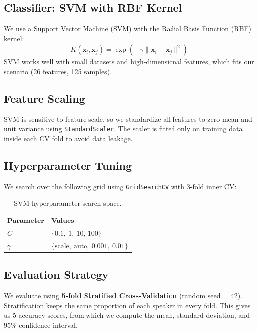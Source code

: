 \subsection{Classifier: SVM with RBF Kernel}
We use a Support Vector Machine (SVM) with the Radial Basis Function (RBF) kernel:
$$K(\mathbf{x}_i, \mathbf{x}_j) = \exp\left(-\gamma \|\mathbf{x}_i - \mathbf{x}_j\|^2\right)$$
SVM works well with small datasets and high-dimensional features, which fits our scenario (26 features, 125 samples).

\subsection{Feature Scaling}
SVM is sensitive to feature scale, so we standardize all features to zero mean and unit variance using \texttt{StandardScaler}. The scaler is fitted only on training data inside each CV fold to avoid data leakage.

\subsection{Hyperparameter Tuning}
We search over the following grid using \texttt{GridSearchCV} with 3-fold inner CV:

\begin{table}[ht]
\centering
\begin{tabular}{|l|l|}
\hline
\textbf{Parameter} & \textbf{Values} \\
\hline
$C$ & $\{0.1,\ 1,\ 10,\ 100\}$ \\
$\gamma$ & $\{\text{scale},\ \text{auto},\ 0.001,\ 0.01\}$ \\
\hline
\end{tabular}
\caption{SVM hyperparameter search space.}
\end{table}

\subsection{Evaluation Strategy}
We evaluate using \textbf{5-fold Stratified Cross-Validation} (random seed = 42). Stratification keeps the same proportion of each speaker in every fold. This gives us 5 accuracy scores, from which we compute the mean, standard deviation, and 95\% confidence interval.

